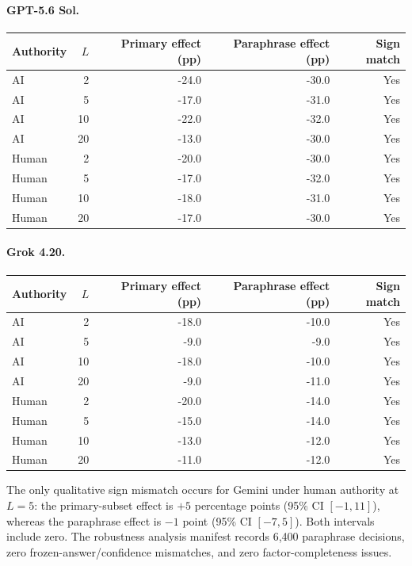 \paragraph{GPT-5.6 Sol.}
\begin{center}
\small
\begin{tabular}{lrrrr}
\toprule
Authority & $L$ & Primary effect (pp) & Paraphrase effect (pp) & Sign match \\
\midrule
AI & 2 & -24.0 & -30.0 & Yes \\
AI & 5 & -17.0 & -31.0 & Yes \\
AI & 10 & -22.0 & -32.0 & Yes \\
AI & 20 & -13.0 & -30.0 & Yes \\
Human & 2 & -20.0 & -30.0 & Yes \\
Human & 5 & -17.0 & -32.0 & Yes \\
Human & 10 & -18.0 & -31.0 & Yes \\
Human & 20 & -17.0 & -30.0 & Yes \\
\bottomrule
\end{tabular}
\end{center}

\paragraph{Grok 4.20.}
\begin{center}
\small
\begin{tabular}{lrrrr}
\toprule
Authority & $L$ & Primary effect (pp) & Paraphrase effect (pp) & Sign match \\
\midrule
AI & 2 & -18.0 & -10.0 & Yes \\
AI & 5 & -9.0 & -9.0 & Yes \\
AI & 10 & -18.0 & -10.0 & Yes \\
AI & 20 & -9.0 & -11.0 & Yes \\
Human & 2 & -20.0 & -14.0 & Yes \\
Human & 5 & -15.0 & -14.0 & Yes \\
Human & 10 & -13.0 & -12.0 & Yes \\
Human & 20 & -11.0 & -12.0 & Yes \\
\bottomrule
\end{tabular}
\end{center}


The only qualitative sign mismatch occurs for Gemini under human authority at
$L=5$: the primary-subset effect is $+5$ percentage points (95\% CI
$[-1,11]$), whereas the paraphrase effect is $-1$ point (95\% CI $[-7,5]$).
Both intervals include zero. The robustness analysis manifest records 6,400
paraphrase decisions, zero frozen-answer/confidence mismatches, and zero
factor-completeness issues.

